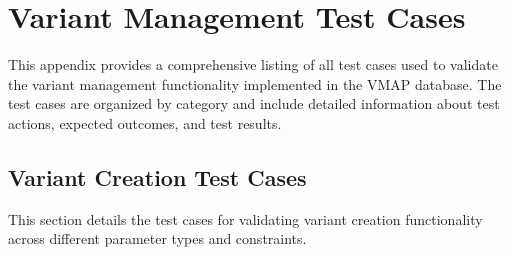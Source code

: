 \chapter{Variant Management Test Cases}
\label{appendix:variant-management-tests}

This appendix provides a comprehensive listing of all test cases used to validate the variant management functionality implemented in the \ac{VMAP} database. The test cases are organized by category and include detailed information about test actions, expected outcomes, and test results.

\section{Variant Creation Test Cases}
\label{sec:variant-creation-tests}

This section details the test cases for validating variant creation functionality across different parameter types and constraints.

